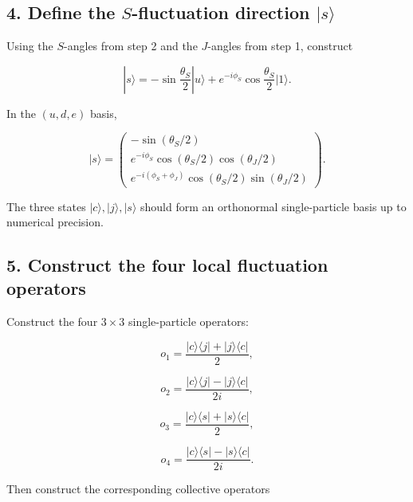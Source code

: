 \documentclass[11pt]{article}
\begin{document}
\subsection*{4. Define the \(S\)-fluctuation direction \(|s\rangle\)}

Using the \(S\)-angles from step 2 and the \(J\)-angles from step 1, construct

\begin{equation}
|s\rangle =
-\sin\frac{\theta_S}{2}|u\rangle
+
e^{-i\phi_S}\cos\frac{\theta_S}{2}|1\rangle.
\end{equation}

In the \((u,d,e)\) basis,

\begin{equation}
|s\rangle =
\begin{pmatrix}
-\sin(\theta_S/2) \\
e^{-i\phi_S}\cos(\theta_S/2)\cos(\theta_J/2) \\
e^{-i(\phi_S+\phi_J)}\cos(\theta_S/2)\sin(\theta_J/2)
\end{pmatrix}.
\end{equation}

The three states \(|c\rangle,|j\rangle,|s\rangle\) should form an orthonormal
single-particle basis up to numerical precision.

\subsection*{5. Construct the four local fluctuation operators}

Construct the four \(3\times3\) single-particle operators:

\begin{equation}
o_1 =
\frac{|c\rangle\langle j|+|j\rangle\langle c|}{2},
\end{equation}

\begin{equation}
o_2 =
\frac{|c\rangle\langle j|-|j\rangle\langle c|}{2i},
\end{equation}

\begin{equation}
o_3 =
\frac{|c\rangle\langle s|+|s\rangle\langle c|}{2},
\end{equation}

\begin{equation}
o_4 =
\frac{|c\rangle\langle s|-|s\rangle\langle c|}{2i}.
\end{equation}

Then construct the corresponding collective operators
\end{document}
